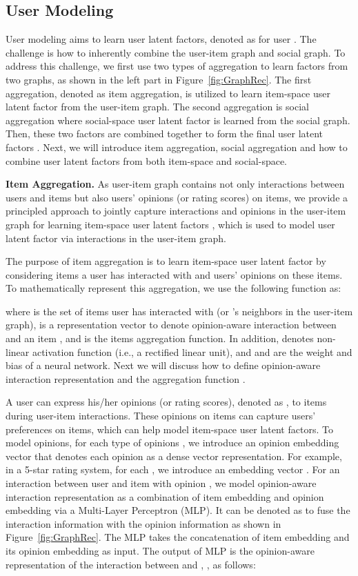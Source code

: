 \documentclass[sigconf]{acmart} \copyrightyear{2019}
\begin{document}
\subsection{User Modeling}
\label{sec:User_Modeling}

User modeling aims to learn user latent factors, denoted as  for user . The challenge is how to inherently combine the user-item graph and social graph. To address this challenge, we first use two types of aggregation to learn factors from two graphs, as shown in the left part in Figure~\ref{fig:GraphRec}.  The first aggregation, denoted as item aggregation, is utilized to learn item-space user latent factor  from the user-item graph. The second aggregation is social aggregation where social-space user latent factor  is learned from the social graph.  Then, these two factors are combined together to form the final user latent factors . Next, we will introduce item aggregation, social aggregation and how to combine user latent factors from both item-space and social-space. 

{\bf Item Aggregation.} As user-item graph contains not only interactions between users and items but also users' opinions (or rating scores) on items, we provide a principled approach to jointly capture interactions and opinions in the user-item graph for learning item-space user latent factors , which is used to model user latent factor via interactions in the user-item graph.
 
The purpose of item aggregation is to learn item-space user latent factor  by considering items a user  has interacted with and users' opinions on these items. To mathematically represent this aggregation, we use the following function as:

where  is the set of items user  has interacted with (or 's neighbors in the user-item graph),  is a representation vector to denote opinion-aware interaction between  and an item , and  is the items aggregation function. In addition,  denotes non-linear activation function (i.e., a rectified linear unit), and  and  are the weight and bias of a neural network. Next we will discuss how to define opinion-aware interaction representation  and the aggregation function . 

A user can express his/her opinions (or rating scores), denoted as , to items during user-item interactions. These opinions on items can capture users' preferences on items, which can help model item-space user latent factors. To model opinions, for each type of opinions , we introduce an opinion embedding vector  that denotes each opinion  as a dense vector representation. For example, in a 5-star rating system, for each , we introduce an embedding vector . For an interaction between user  and item  with opinion , we model opinion-aware interaction representation  as a combination of item embedding  and opinion embedding  via a Multi-Layer Perceptron (MLP). It can be denoted as  to fuse the interaction information with the opinion information as shown in Figure~\ref{fig:GraphRec}. The MLP takes the concatenation of item embedding  and its opinion embedding  as input. The output of MLP is the opinion-aware representation of the interaction between  and , , as follows:
\end{document}
